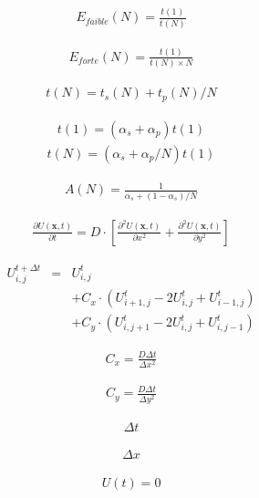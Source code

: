 \documentclass{article}
\begin{document}
\huge{
\begin{eqnarray}
E_{faible}(N) = \frac{ t(1) }{ t(N) }
\end{eqnarray}

\begin{eqnarray}
E_{forte}(N) = \frac{ t(1) }{ t(N) \times N }
\end{eqnarray}

\begin{eqnarray}
t(N) = t_s(N) + t_p(N) / N
\end{eqnarray}

\begin{eqnarray}
t(1) = \left( \alpha_s + \alpha_p \right) t(1)
\end{eqnarray}
\begin{eqnarray}
t(N) = \left( \alpha_s + \alpha_p/N \right) t(1)
\end{eqnarray}

\begin{eqnarray}
A(N) = \frac{1}{\alpha_s + \left(1 - \alpha_s \right) / N}
\end{eqnarray}

\begin{eqnarray}
\frac{\partial U(\mathbf{x},t)}{\partial t} = D \cdot \left[ \frac{\partial^2 U(\mathbf{x},t)}{\partial x^2}  + \frac{\partial^2 U(\mathbf{x},t)}{\partial y^2}\right] \nonumber
\end{eqnarray}

\begin{eqnarray}
U^{t+\Delta t}_{i,j} & = & U^{t}_{i,j}                                        \nonumber \\
& & + C_x  \cdot \left( U^{t}_{i+1,j} - 2 U^{t}_{i,j} + U^{t}_{i-1,j} \right) \nonumber \\
& & + C_y  \cdot \left( U^{t}_{i,j+1} - 2 U^{t}_{i,j} + U^{t}_{i,j-1} \right) \nonumber
\end{eqnarray}

\begin{eqnarray}
C_x =\frac{D \Delta t }{\Delta x^2}
\end{eqnarray}

\begin{eqnarray}
C_y =\frac{D \Delta t }{\Delta y^2}
\end{eqnarray}

\begin{eqnarray}
\Delta t
\end{eqnarray}

\begin{eqnarray}
\Delta x
\end{eqnarray}

\begin{eqnarray}
U(t) = 0
\end{eqnarray}


}
\end{document}
